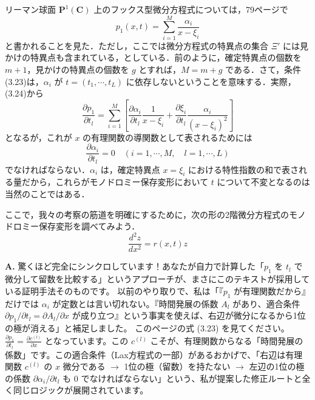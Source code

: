 \begin{story}
リーマン球面 $\mathbf{P}^1(\mathbf{C})$ 上のフックス型微分方程式については，79ページで
\begin{equation}
    p_1(x,t) = \sum_{i=1}^M \frac{\alpha_i}{x-\xi_i} \label{eq:3.24}
\end{equation}
と書かれることを見た．ただし，ここでは微分方程式の特異点の集合 $\Xi'$ には見かけの特異点も含まれている，としている．前のように，確定特異点の個数を $m+1$，見かけの特異点の個数を $g$ とすれば，$M=m+g$ である．さて，条件(3.23)は，$\alpha_i$ が $t=(t_1,\cdots,t_L)$ に依存しないということを意味する．実際，(3.24)から
\begin{equation*}
    \frac{\partial p_1}{\partial t_l} = \sum_{i=1}^M \left[ \frac{\partial \alpha_i}{\partial t_l} \frac{1}{x-\xi_i} + \frac{\partial \xi_i}{\partial t_l} \frac{\alpha_i}{(x-\xi_i)^2} \right]
\end{equation*}
となるが，これが $x$ の有理関数の導関数として表されるためには
\begin{equation*}
    \frac{\partial \alpha_i}{\partial t_l} = 0 \quad (i=1,\cdots,M, \quad l=1,\cdots,L)
\end{equation*}
でなければならない．$\alpha_i$ は，確定特異点 $x=\xi_i$ における特性指数の和で表される量だから，これらがモノドロミー保存変形において $t$ について不変となるのは当然のことではある．

ここで，我々の考察の筋道を明確にするために，次の形の2階微分方程式のモノドロミー保存変形を調べてみよう．
\begin{equation}
    \frac{d^2 z}{dx^2} = r(x,t)z \label{eq:3.25}
\end{equation}
\end{story}

\vspace{2em}

\begin{Q}
\textbf{A.} 驚くほど完全にシンクロしています！あなたが自力で計算した「$p_1$ を $t_l$ で微分して留数を比較する」というアプローチが、まさにこのテキストが採用している証明手法そのものです。
以前のやり取りで、私は「『$p_1$ が有理関数だから』だけでは $\alpha_i$ が定数とは言い切れない。『時間発展の係数 $A_l$ があり、適合条件 $\partial p_1/\partial t_l = \partial A_l/\partial x$ が成り立つ』という事実を使えば、右辺が微分になるから1位の極が消える」と補足しました。
このページの式 (3.23) を見てください。$\frac{\partial p_1}{\partial t_l} = \frac{\partial c^{(l)}}{\partial x}$ となっています。この $c^{(l)}$ こそが、有理関数からなる「時間発展の係数」です。この適合条件（Lax方程式の一部）があるおかげで、「右辺は有理関数 $c^{(l)}$ の $x$ 微分である $\to$ 1位の極（留数）を持たない $\to$ 左辺の1位の極の係数 $\partial \alpha_i / \partial t_l$ も $0$ でなければならない」という、私が提案した修正ルートと全く同じロジックが展開されています。
\end{Q}

